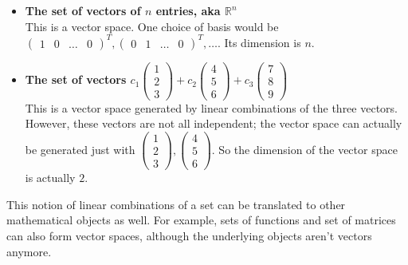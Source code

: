 \documentclass[11pt]{article}
\theoremstyle{plain} %
\theoremstyle{definition}
\theoremstyle{remark}
\begin{document}
\begin{itemize}
\item \textbf{The set of vectors of $n$ entries, aka $\mathbb{R}^n$}\\
This is a vector space. One choice of basis would be $\begin{pmatrix}1 & 0 & \ldots & 0 \end{pmatrix}^T, \begin{pmatrix}0 & 1 & \ldots & 0 \end{pmatrix}^T, \ldots$. Its dimension is $n$.

\item \textbf{The set of vectors $c_1\begin{pmatrix}1\\ 2\\ 3\end{pmatrix} + c_2\begin{pmatrix}4\\ 5\\ 6\end{pmatrix} + c_3\begin{pmatrix}7\\ 8\\ 9\end{pmatrix}$}\\
This is a vector space generated by linear combinations of the three vectors. However, these vectors are not all independent; the vector space can actually be generated just with $\begin{pmatrix}1\\ 2\\ 3\end{pmatrix},\begin{pmatrix}4\\ 5\\ 6\end{pmatrix}$. So the dimension of the vector space is actually $2$.
\end{itemize}

This notion of linear combinations of a set can be translated to other mathematical objects as well. For example, sets of functions and set of matrices can also form vector spaces, although the underlying objects aren't vectors anymore.
\end{document}
